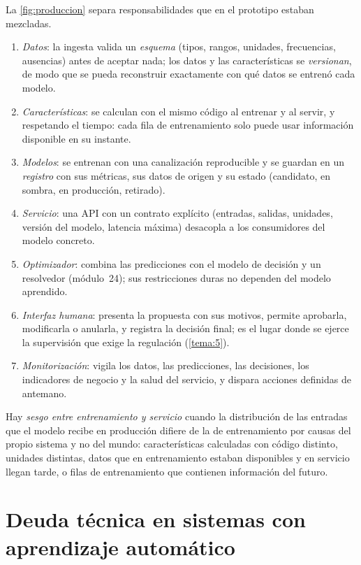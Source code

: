 La \cref{fig:produccion} separa responsabilidades que en el prototipo estaban mezcladas.
\begin{enumerate}[label=\arabic*.]
  \item \emph{Datos}: la ingesta valida un \emph{esquema} (tipos, rangos, unidades, frecuencias, ausencias) antes de aceptar nada; los datos y las características se \emph{versionan}, de modo que se pueda reconstruir exactamente con qué datos se entrenó cada modelo.
  \item \emph{Características}: se calculan con el mismo código al entrenar y al servir, y respetando el tiempo: cada fila de entrenamiento solo puede usar información disponible en su instante.
  \item \emph{Modelos}: se entrenan con una canalización reproducible y se guardan en un \emph{registro} con sus métricas, sus datos de origen y su estado (candidato, en sombra, en producción, retirado).
  \item \emph{Servicio}: una API con un contrato explícito (entradas, salidas, unidades, versión del modelo, latencia máxima) desacopla a los consumidores del modelo concreto.
  \item \emph{Optimizador}: combina las predicciones con el modelo de decisión y un resolvedor (módulo~24); sus restricciones duras no dependen del modelo aprendido.
  \item \emph{Interfaz humana}: presenta la propuesta con sus motivos, permite aprobarla, modificarla o anularla, y registra la decisión final; es el lugar donde se ejerce la supervisión que exige la regulación (\cref{tema:5}).
  \item \emph{Monitorización}: vigila los datos, las predicciones, las decisiones, los indicadores de negocio y la salud del servicio, y dispara acciones definidas de antemano.
\end{enumerate}

\begin{definicion}\label{def:skew}
Hay \emph{sesgo entre entrenamiento y servicio} cuando la distribución de las entradas que el modelo recibe en producción difiere de la de entrenamiento por causas del propio sistema y no del mundo: características calculadas con código distinto, unidades distintas, datos que en entrenamiento estaban disponibles y en servicio llegan tarde, o filas de entrenamiento que contienen información del futuro.
\end{definicion}

\section{Deuda técnica en sistemas con aprendizaje automático}

